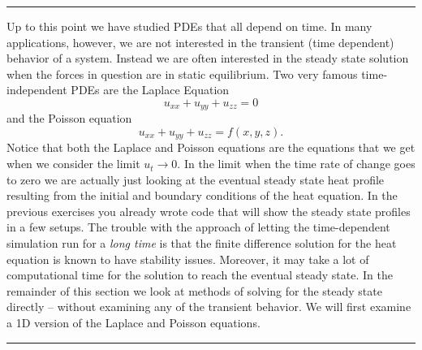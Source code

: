 \documentclass[
]{book}
\theoremstyle{definition}
\theoremstyle{definition}
\theoremstyle{definition}
\theoremstyle{remark}
\begin{document}
\begin{center}\rule{0.5\linewidth}{0.5pt}\end{center}

Up to this point we have studied PDEs that all depend on time. In many applications, however, we are not interested in the transient (time dependent) behavior of a system. Instead we are often interested in the steady state solution when the forces in question are in static equilibrium. Two very famous time-independent PDEs are the Laplace Equation
\[ u_{xx} + u_{yy} + u_{zz} = 0 \]
and the Poisson equation
\[ u_{xx} + u_{yy} + u_{zz} = f(x,y,z). \]
Notice that both the Laplace and Poisson equations are the equations that we get when we consider the limit \(u_t \to 0\). In the limit when the time rate of change goes to zero we are actually just looking at the eventual steady state heat profile resulting from the initial and boundary conditions of the heat equation. In the previous exercises you already wrote code that will show the steady state profiles in a few setups. The trouble with the approach of letting the time-dependent simulation run for a \emph{long time} is that the finite difference solution for the heat equation is known to have stability issues. Moreover, it may take a lot of computational time for the solution to reach the eventual steady state. In the remainder of this section we look at methods of solving for the steady state directly -- without examining any of the transient behavior. We will first examine a 1D version of the Laplace and Poisson equations.

\begin{center}\rule{0.5\linewidth}{0.5pt}\end{center}
\end{document}
